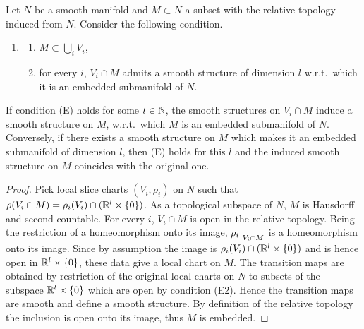 \begin{lem}\label{prop 1.7.3 RS1}
    Let $N$ be a smooth manifold and $M\subset N$ a subset with the relative topology induced from $N$. Consider the following condition.
    \begin{enumerate}[label=(E)]
        \item \begin{enumerate}[label=(E\alph*)]
            \item $M\subset \bigcup_i V_i$,
            \item for every $i$, $V_i\cap M$ admits a smooth structure of dimension $l$ w.r.t.\ which it is an embedded submanifold of $N$.
        \end{enumerate}
    \end{enumerate}
    If condition (E) holds for some $l\in\mathbb{N}$, the smooth structures on $V_i\cap M$ induce a smooth structure on $M$, w.r.t.\ which $M$ is an embedded submanifold of $N$. Conversely, if there exists a smooth structure on $M$ which makes it an embedded submanifold of dimension $l$, then (E) holds for this $l$ and the induced smooth structure on $M$ coincides with the original one.
\end{lem}
\begin{proof}
    Pick local slice charts $(V_i,\rho_i)$ on $N$ such that $\rho(V_i\cap M)=\rho_i(V_i)\cap (\mathbb{R}^l\times \{0\})$. As a topological subspace of $N$, $M$ is Hausdorff and second countable. For every $i$, $V_i\cap M$ is open in the relative topology. Being the restriction of a homeomorphism onto its image, $\restr{\rho_i}{V_i\cap M}$ is a homeomorphism onto its image. Since by assumption the image is $\rho_i(V_i)\cap (\mathbb{R}^l\times\{0\})$ and is hence open in $\mathbb{R}^l\times\{0\}$, these data give a local chart on $M$. The transition maps are obtained by restriction of the original local charts on $N$ to subsets of the subspace $\mathbb{R}^l\times\{0\}$ which are open by condition (E2). Hence the transition maps are smooth and define a smooth structure. By definition of the relative topology the inclusion is open onto its image, thus $M$ is embedded.
\end{proof}


